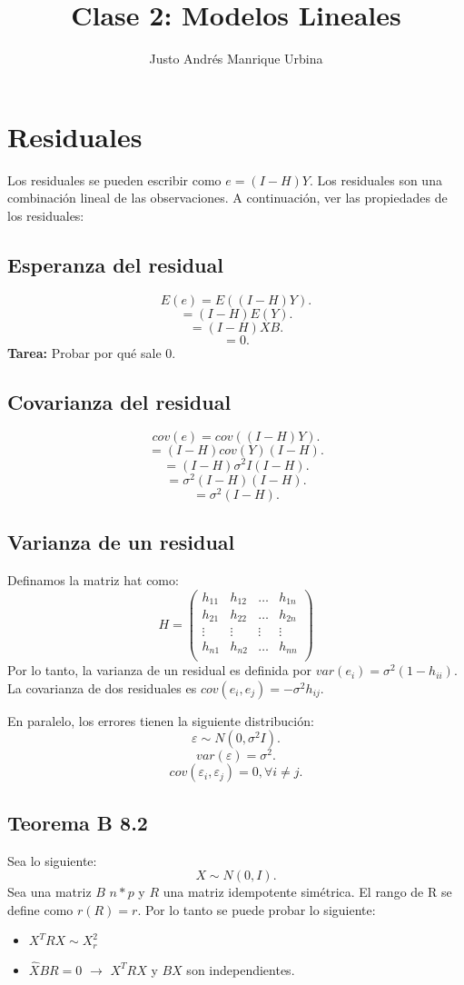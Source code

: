 \documentclass{article}
\title{Clase 2: Modelos Lineales}
\author{Justo Andrés Manrique Urbina}
\begin{document}
\maketitle
\section{Residuales}
Los residuales se pueden escribir como $e=(I-H)Y$. Los residuales son una combinación lineal de las observaciones. A continuación, ver las propiedades de los residuales:
\subsection{Esperanza del residual}
\[ E(e)=E((I-H)Y) .\]
\[ =(I-H)E(Y) .\]
\[ =(I-H)XB .\]
\[ =0 .\]
\textbf{Tarea:} Probar por qué sale 0.
\subsection{Covarianza del residual}
\[ cov(e)=cov((I-H)Y) .\]
\[ =(I-H) cov(Y) (I-H).\]
\[ =(I-H)\sigma^{2} I (I-H) .\]
\[ =\sigma^{2}(I-H)(I-H) .\]
\[ =\sigma^{2}(I-H) .\]
\subsection{Varianza de un residual}
Definamos la matriz hat como:
\[
H= 
\begin{pmatrix}
h_{11} & h_{12} & \ldots & h_{1n} \\
h_{21} & h_{22} & \ldots & h_{2n} \\
\vdots & \vdots & \vdots & \vdots \\
h_{n1} & h_{n2} & \ldots & h_{nn} \\
\end{pmatrix}
\]
Por lo tanto, la varianza de un residual es definida por $var(e_{i})=\sigma^{2}(1-h_{ii})$. La covarianza de dos residuales es $cov(e_{i},e_{j})=-\sigma^{2}h_{ij}$.

En paralelo, los errores tienen la siguiente distribución:
\[ \varepsilon \sim N(0,\sigma^{2}I) .\]
\[ var(\varepsilon)=\sigma^{2} .\]
\[ cov(\varepsilon_{i},\varepsilon_{j})=0, \forall i \neq j .\]

\subsection{Teorema B 8.2}
Sea lo siguiente:
\[ X \sim N(0,I) .\]
Sea una matriz $B$ $n*p$ y $R$ una matriz idempotente simétrica. El rango de R se define como $r(R)=r$. Por lo tanto se puede probar lo siguiente:
\begin{itemize}
	\item $X^{T}RX \sim X^{2}_{r}$
	\item $\hat{X}BR=0$ $\rightarrow$ $X^{T}RX$ y $BX$ son independientes.
\end{itemize}
\end{document}
